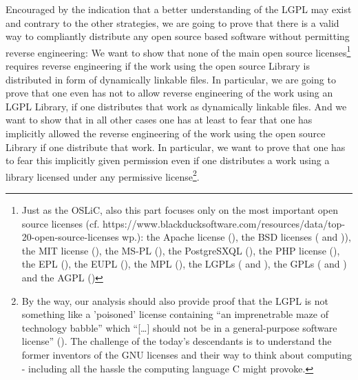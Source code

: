 \label{RevEngOslicOsLisences}
Encouraged by the indication that a better understanding of the LGPL may exist
and contrary to the other strategies, we are going to prove that there is a
valid way to compliantly distribute any open source based software without
permitting reverse engineering: We want to show that none of the main open
source licenses\footnote{Just as the OSLiC, also this part focuses only on the
most important open source licenses (cf.
https://www.blackducksoftware.com/resources/data/top-20-open-source-licenses
wp.): the Apache license (\cite[cf.][\nopage wp.]{Apl20OsiLicense2004a}), the
BSD licenses (\cite[cf.][\nopage wp.]{BsdLicense3Clause} and \cite[cf.][\nopage
wp.]{BsdLicense2Clause})), the MIT license (\cite[cf.][\nopage
wp.]{MitLicense2012a}), the MS-PL (\cite[cf.][\nopage
wp.]{MsplOsiLicense2013a}), the PostgreSXQL (\cite[cf.][\nopage
wp.]{PglOsiLicense2013a}), the PHP license (\cite[cf.][\nopage
wp.]{Php30OsiLicense2013a}), the EPL (\cite[cf.][\nopage
wp.]{Epl10OsiLicense2005a}), the EUPL (\cite[cf.][\nopage
wp.]{Eupl11OsiLicense2007a}), the MPL (\cite[cf.][\nopage
wp.]{Mpl20OsiLicense2013a}), the LGPLs (\cite[cf.][\nopage
wp.]{Lgpl21OsiLicense1999a} and \cite[cf.][\nopage wp.]{Lgpl30OsiLicense2007a}),
the GPLs (\cite[cf.][\nopage wp.]{Gpl20OsiLicense1991a} and \cite[cf.][\nopage
wp.]{Gpl30OsiLicense2007a}) and the AGPL (\cite[cf.][\nopage
wp.]{Agpl30OsiLicense2007a})} requires reverse engineering if the work using
the open source Library is distributed in form of dynamically linkable files. In
particular, we are going to prove that one even has not to allow reverse
engineering of the work using an LGPL Library, if one distributes that work as
dynamically linkable files. And we want to show that in all other cases one has
at least to fear that one has implicitly allowed the reverse engineering of the
work using the open source Library if one distribute that work. In particular,
we want to prove that one has to fear this implicitly given permission even if
one distributes a work using a library licensed under any permissive
license\footnote{By the way, our analysis should also provide proof that the
LGPL is not something like a 'poisoned' license containing \enquote{an
imprenetrable maze of technology babble} which \enquote{[\ldots] should not be
in a general-purpose software license} (\cite[cf.][124]{Rosen2005a}). The
challenge of the today's descendants is to understand the former inventors of
the GNU licenses and their way to think about computing - including all the
hassle the computing language C might provoke.}.

